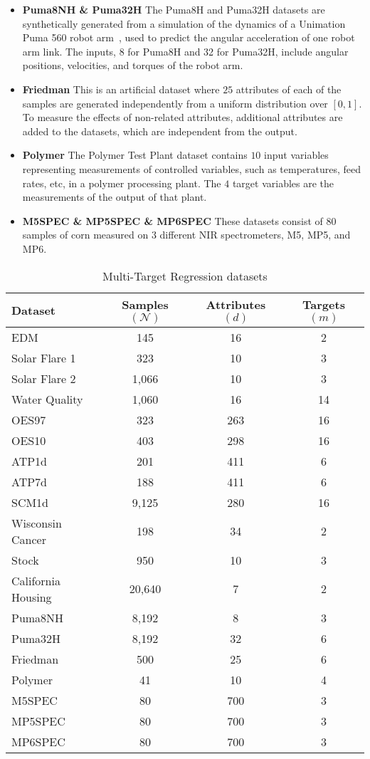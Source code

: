 \documentclass[preprint,12pt]{elsarticle}
\begin{document}
\begin{itemize}
\item \textbf{Puma8NH \& Puma32H} The Puma8H and Puma32H datasets are synthetically generated from a simulation of the dynamics of a Unimation Puma 560 robot arm~\cite{Lichman:2013}, used to predict the angular acceleration of one robot arm link. The inputs, 8 for Puma8H and 32 for Puma32H, include angular positions, velocities, and torques of the robot arm.
\item \textbf{Friedman} This is an artificial dataset where $25$ attributes of each of the samples are generated independently from a uniform distribution over $[0,1]$. To measure the effects of non-related attributes, additional attributes are added to the datasets, which are independent from the output. 
\item \textbf{Polymer} The Polymer Test Plant dataset contains $10$ input variables representing measurements of controlled variables, such as temperatures, feed rates, etc, in a polymer processing plant. The $4$ target variables are the measurements of the output of that plant.
\item \textbf{M5SPEC \& MP5SPEC \& MP6SPEC} These datasets consist of $80$ samples of corn measured on $3$ different NIR spectrometers, M5, MP5, and MP6.
\end{itemize}

\begin{table*}[!t]
\renewcommand{\arraystretch}{1.2}
\centering
\caption{Multi-Target Regression datasets}
\begin{tabular}{lccc}
\hline
Dataset & Samples $(\mathcal N)$ & Attributes $(d)$ & Targets $(m)$\\
\hline
EDM & 145 & 16 & 2\\
Solar Flare 1 & 323 & 10 & 3\\
Solar Flare 2 & 1,066 & 10 & 3\\
Water Quality & 1,060 & 16 & 14\\
OES97 & 323 & 263 & 16\\
OES10 & 403 & 298 & 16\\
ATP1d & 201 & 411 & 6\\
ATP7d & 188 & 411 & 6\\
SCM1d & 9,125 & 280 & 16\\
Wisconsin Cancer & 198 & 34 & 2\\
Stock & 950 & 10 & 3\\
California Housing & 20,640 & 7 & 2\\
Puma8NH & 8,192 & 8 & 3\\
Puma32H & 8,192 & 32 & 6\\
Friedman & 500 & 25 & 6\\
Polymer & 41 & 10 & 4\\
M5SPEC & 80 & 700 & 3\\
MP5SPEC & 80 & 700 & 3\\
MP6SPEC & 80 & 700 & 3\\
\hline
\end{tabular}
\label{tab:datasets}
\end{table*}
\end{document}
